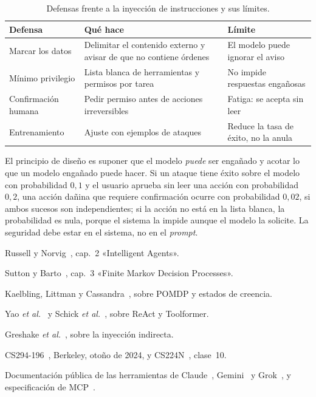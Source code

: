 \begin{table}[h]
\centering\small
\begin{tabularx}{\textwidth}{@{}l>{\raggedright\arraybackslash}X>{\raggedright\arraybackslash}X@{}}
\toprule
Defensa & Qué hace & Límite \\
\midrule
Marcar los datos & Delimitar el contenido externo y avisar de que no contiene órdenes & El modelo puede ignorar el aviso \\
Mínimo privilegio & Lista blanca de herramientas y permisos por tarea & No impide respuestas engañosas \\
Confirmación humana & Pedir permiso antes de acciones irreversibles & Fatiga: se acepta sin leer \\
Entrenamiento & Ajuste con ejemplos de ataques & Reduce la tasa de éxito, no la anula \\
\bottomrule
\end{tabularx}
\caption{Defensas frente a la inyección de instrucciones y sus límites.}
\label{tab:defensas}
\end{table}

\begin{observacion}
El principio de diseño es suponer que el modelo \emph{puede} ser engañado y acotar lo que un modelo engañado puede hacer. Si un ataque tiene éxito sobre el modelo con probabilidad $0{,}1$ y el usuario aprueba sin leer una acción con probabilidad $0{,}2$, una acción dañina que requiere confirmación ocurre con probabilidad $0{,}02$, si ambos sucesos son independientes; si la acción no está en la lista blanca, la probabilidad es nula, porque el sistema la impide aunque el modelo la solicite. La seguridad debe estar en el sistema, no en el \emph{prompt}.
\end{observacion}

\begin{lecturas}
\item Russell y Norvig~\cite{aima}, cap.~2 «Intelligent Agents».
\item Sutton y Barto~\cite{sb}, cap.~3 «Finite Markov Decision Processes».
\item Kaelbling, Littman y Cassandra~\cite{kaelbling}, sobre POMDP y estados de creencia.
\item Yao \emph{et al.}~\cite{react} y Schick \emph{et al.}~\cite{toolformer}, sobre ReAct y Toolformer.
\item Greshake \emph{et al.}~\cite{greshake}, sobre la inyección indirecta.
\item CS294-196~\cite{cs294}, Berkeley, otoño de 2024, y CS224N~\cite{cs224n}, clase~10.
\item Documentación pública de las herramientas de Claude~\cite{claude-tools}, Gemini~\cite{gemini-fc} y Grok~\cite{xai-fc}, y especificación de MCP~\cite{mcp-spec}.
\end{lecturas}

